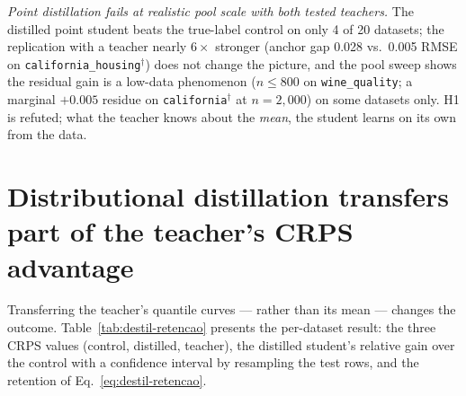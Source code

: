 \emph{Point distillation fails at realistic pool scale with both
tested teachers.} The distilled point student beats the true-label
control on only 4 of 20 datasets; the replication with a teacher
nearly $6\times$ stronger (anchor gap 0.028 vs.\ 0.005 RMSE on
\texttt{california\_\allowbreak housing}$^\dagger$) does not change
the picture, and the pool sweep shows the residual gain is a
low-data phenomenon ($n \leq 800$ on \texttt{wine\_quality}; a
marginal $+0.005$ residue on \texttt{california}$^\dagger$ at
$n{=}2{,}000$) on some datasets only. H1 is
refuted; what the teacher knows about the \emph{mean}, the student
learns on its own from the data.

\section{Distributional distillation transfers part of the teacher's
CRPS advantage}
\label{sec:destil-dist}

Transferring the teacher's quantile curves --- rather than its mean
--- changes the outcome. Table~\ref{tab:destil-retencao} presents
the per-dataset result: the three CRPS values (control, distilled,
teacher), the distilled student's relative gain over the control
with a confidence interval by resampling the test rows, and the
retention of Eq.~\ref{eq:destil-retencao}.

